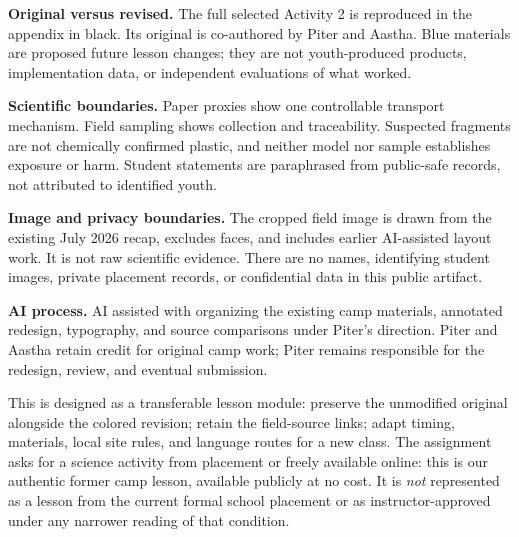 \begin{notebox}
\textbf{Original versus revised.} The full selected Activity 2 is reproduced in the appendix in black. Its original is co-authored by Piter and Aastha. Blue materials are proposed future lesson changes; they are not youth-produced products, implementation data, or independent evaluations of what worked.\par
\textbf{Scientific boundaries.} Paper proxies show one controllable transport mechanism. Field sampling shows collection and traceability. Suspected fragments are not chemically confirmed plastic, and neither model nor sample establishes exposure or harm. Student statements are paraphrased from public-safe records, not attributed to identified youth.\par
\textbf{Image and privacy boundaries.} The cropped field image is drawn from the existing July 2026 recap, excludes faces, and includes earlier AI-assisted layout work. It is not raw scientific evidence. There are no names, identifying student images, private placement records, or confidential data in this public artifact.\par
\textbf{AI process.} AI assisted with organizing the existing camp materials, annotated redesign, typography, and source comparisons under Piter's direction. Piter and Aastha retain credit for original camp work; Piter remains responsible for the redesign, review, and eventual submission.
\end{notebox}
This is designed as a transferable lesson module: preserve the unmodified original alongside the colored revision; retain the field-source links; adapt timing, materials, local site rules, and language routes for a new class. The assignment asks for a science activity from placement or freely available online: this is our authentic former camp lesson, available publicly at no cost. It is \emph{not} represented as a lesson from the current formal school placement or as instructor-approved under any narrower reading of that condition.
